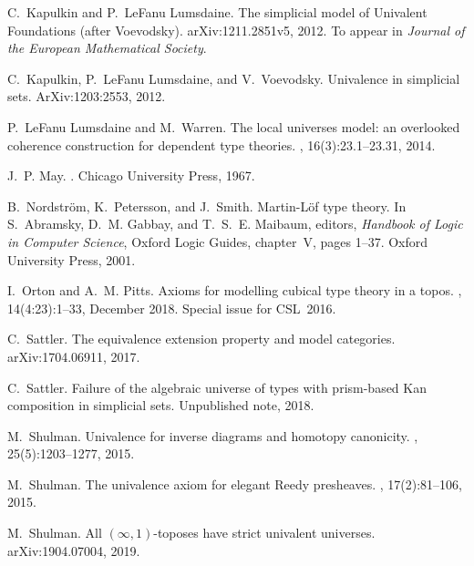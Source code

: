 \documentclass[reqno,10pt,a4paper,oneside]{amsart}
\numberwithin{equation}{section}
\theoremstyle{mythm}
\theoremstyle{mydef}
\theoremstyle{myrmk}
\begin{document}
\begin{thebibliography}{{}dBM15}
C.~Kapulkin and P.~LeFanu Lumsdaine.
\newblock The simplicial model of {U}nivalent {F}oundations (after
  {V}oevodsky).
\newblock arXiv:1211.2851v5, 2012.
\newblock To appear in \emph{Journal of the European Mathematical Society}.

C.~Kapulkin, P.~LeFanu Lumsdaine, and V.~Voevodsky.
\newblock Univalence in simplicial sets.
\newblock ArXiv:1203:2553, 2012.

P.~LeFanu Lumsdaine and M.~Warren.
\newblock The local universes model: an overlooked coherence construction for
  dependent type theories.
, 16(3):23.1--23.31, 2014.

J.~P. May.
.
\newblock Chicago University Press, 1967.

B.~Nordstr\"om, K.~Petersson, and J.~Smith.
\newblock Martin-{L}\"of type theory.
\newblock In S.~Abramsky, D.~M. Gabbay, and T.~S.~E. Maibaum, editors, {\em
  Handbook of Logic in Computer Science}, Oxford Logic Guides, chapter~V, pages
  1--37. Oxford University Press, 2001.

I.~Orton and A.~M. Pitts.
\newblock Axioms for modelling cubical type theory in a topos.
, 14(4:23):1--33, December
  2018.
\newblock Special issue for CSL~2016.

C.~Sattler.
\newblock The equivalence extension property and model categories.
\newblock arXiv:1704.06911, 2017.

C.~Sattler.
\newblock Failure of the algebraic universe of types with prism-based {K}an
  composition in simplicial sets.
\newblock Unpublished note, 2018.

M.~Shulman.
\newblock Univalence for inverse diagrams and homotopy canonicity.
, 25(5):1203--1277, 2015.

M.~Shulman.
\newblock The univalence axiom for elegant {R}eedy presheaves.
, 17(2):81--106, 2015.


M.~Shulman.
\newblock All $(\infty,1)$-toposes have strict univalent universes.
\newblock arXiv:1904.07004, 2019.


\end{thebibliography}
\end{document}
